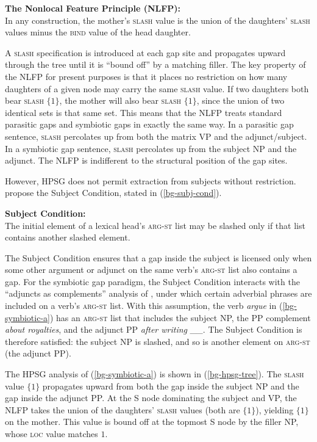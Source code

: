\documentclass[12pt]{article}
\newcommand{\sltag}[1]{\ensuremath{\boxed{#1}}}
\begin{document}
\ex\label{bg-nlfp} \textbf{The Nonlocal Feature Principle (NLFP):}\\
In any construction, the mother's \textsc{slash} value is the union of the daughters' \textsc{slash} values minus the \textsc{bind} value of the head daughter.
\xe

\noindent A \textsc{slash} specification is introduced at each gap site and propagates upward through the tree until it is ``bound off'' by a matching filler. The key property of the NLFP for present purposes is that it places no restriction on how many daughters of a given node may carry the same \textsc{slash} value. If two daughters both bear \textsc{slash} $\{\sltag{1}\}$, the mother will also bear \textsc{slash} $\{\sltag{1}\}$, since the union of two identical sets is that same set. This means that the NLFP treats standard parasitic gaps and symbiotic gaps in exactly the same way. In a parasitic gap sentence, \textsc{slash} percolates up from both the matrix VP and the adjunct/subject. In a symbiotic gap sentence, \textsc{slash} percolates up from the subject NP and the adjunct. The NLFP is indifferent to the structural position of the gap sites.

However, HPSG does not permit extraction from subjects without restriction. \citet{pollard1994} propose the Subject Condition, stated in (\ref{bg-subj-cond}).

\ex\label{bg-subj-cond} \textbf{Subject Condition:}\\
The initial element of a lexical head's \textsc{arg-st} list may be slashed only if that list contains another slashed element.
\xe

\noindent The Subject Condition ensures that a gap inside the subject is licensed only when some other argument or adjunct on the same verb's \textsc{arg-st} list also contains a gap. For the symbiotic gap paradigm, the Subject Condition interacts with the ``adjuncts as complements'' analysis of \citet{bouma2001}, under which certain adverbial phrases are included on a verb's \textsc{arg-st} list. With this assumption, the verb \emph{argue} in (\ref{bg-symbiotic-a}) has an \textsc{arg-st} list that includes the subject NP, the PP complement \emph{about royalties}, and the adjunct PP \emph{after writing \_\_}. The Subject Condition is therefore satisfied: the subject NP is slashed, and so is another element on \textsc{arg-st} (the adjunct PP).

The HPSG analysis of (\ref{bg-symbiotic-a}) is shown in (\ref{bg-hpsg-tree}). The \textsc{slash} value $\{\sltag{1}\}$ propagates upward from both the gap inside the subject NP and the gap inside the adjunct PP. At the S node dominating the subject and VP, the NLFP takes the union of the daughters' \textsc{slash} values (both are $\{\sltag{1}\}$), yielding $\{\sltag{1}\}$ on the mother. This value is bound off at the topmost S node by the filler NP, whose \textsc{loc} value matches $\sltag{1}$.
\end{document}
